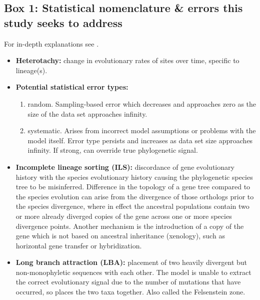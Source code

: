\documentclass[fleqn,10pt,lineno]{wlpeerj} %
\begin{document}
\subsection*{Box 1: Statistical nomenclature \& errors this study seeks to address}
\label{sec:statbox}
For in-depth explanations see \citep{yang2014molecular}.
\begin{itemize}[noitemsep]
\item \textbf{Heterotachy:} change in evolutionary rates of sites over time, specific to lineage(s).
\item \textbf{Potential statistical error types:}
\begin{enumerate}[noitemsep]
\item random. Sampling-based error which decreases and approaches zero as the size of the data set approaches infinity.\\
\item systematic. Arises from incorrect model assumptions or problems with the model itself. 
Error type persists and increases as data set size approaches infinity. 
If strong, can override true phylogenetic signal.
\end{enumerate}
\item \textbf{Incomplete lineage sorting (ILS):} discordance of gene evolutionary history with the species evolutionary history causing the phylogenetic species tree to be misinferred. %
Difference in the topology of a gene tree compared to the species evolution can arise from the divergence of those orthologs prior to the species divergence, where in effect the ancestral populations contain two or more already diverged copies of the gene across one or more species divergence points. 
Another mechanism is the introduction of a copy of the gene which is not based on ancestral inheritance (xenology), such as horizontal gene transfer or hybridization.
\item \textbf{Long branch attraction (LBA):} placement of two heavily divergent but non-monophyletic sequences with each other. 
The model is unable to extract the correct evolutionary signal due to the number of mutations that have occurred, so places the two taxa together. 
Also called the Felsenstein zone.
\end{itemize}
\end{document}
